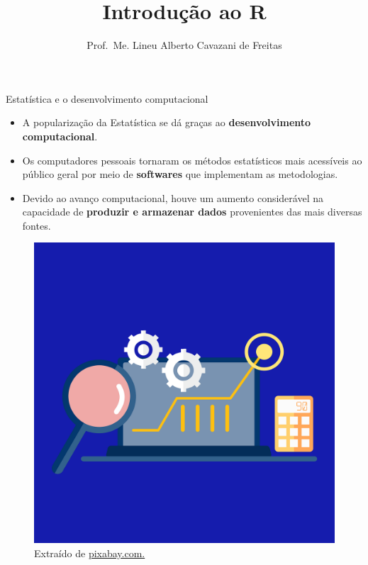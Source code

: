 \documentclass[
  ignorenonframetext,
  serif,
  professionalfont,
  usenames,
  dvipsnames,
  aspectratio = 169]{beamer}
\title{\hfill\break
\textbf{Introdução ao R}}
\author{Prof.~Me. Lineu Alberto Cavazani de Freitas \vspace{-0.5cm}}
\date{}
\providecommand{\tightlist}{%
  \setlength{\itemsep}{0pt}\setlength{\parskip}{0pt}}
\renewcommand{\tightlist}{%
  \setlength{\itemsep}{0\baselineskip}
  \setlength{\parskip}{0.25\baselineskip}
}
\def\beginAHalfColumn{\begin{minipage}{0.49\textwidth}}%
\def\endColumns{\end{minipage}}%
\begin{document}
\frame{\titlepage}

\begin{frame}{Estatística e o desenvolvimento computacional}
\label{estatuxedstica-e-o-desenvolvimento-computacional}
\beginAHalfColumn

\begin{itemize}
\tightlist
\item
  A popularização da Estatística se dá graças ao
  \textbf{desenvolvimento computacional}.
\end{itemize}

\vspace{0.3cm}

\begin{itemize}
\tightlist
\item
  Os computadores pessoais tornaram os métodos estatísticos mais
  acessíveis ao público geral por meio de \textbf{softwares} que
  implementam as metodologias.
\end{itemize}

\vspace{0.3cm}

\begin{itemize}
\tightlist
\item
  Devido ao avanço computacional, houve um aumento considerável na
  capacidade de \textbf{produzir e armazenar dados} provenientes das
  mais diversas fontes.
\end{itemize}

\endColumns
\beginAHalfColumn

\begin{figure}

{\centering \includegraphics[width=0.6\linewidth]{./img/desenvolvimento-computacional} 

}

\caption{Extraído de \href{https://cdn.pixabay.com/photo/2020/04/04/04/23/graph-5000784_1280.png}{pixabay.com.}}\label{fig:unnamed-chunk-2}
\end{figure}

\endColumns
\end{frame}
\end{document}
